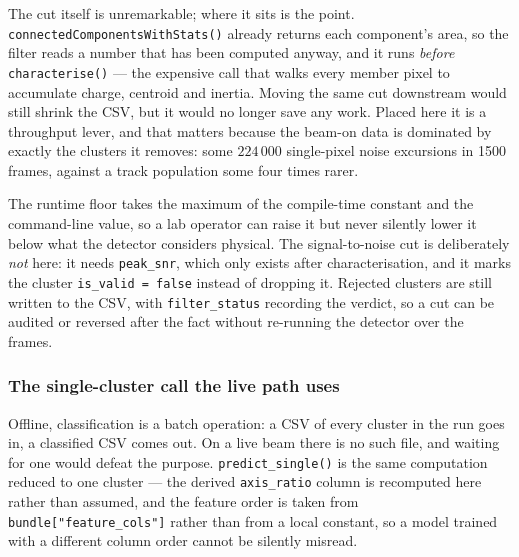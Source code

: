 \documentclass[a4paper,headsepline,oneside,11pt]{scrartcl}
\begin{document}
The cut itself is unremarkable; where it sits is the point.
\texttt{connectedComponentsWithStats()} already returns each component's area,
so the filter reads a number that has been computed anyway, and it runs
\emph{before} \texttt{characterise()} --- the expensive call that walks every
member pixel to accumulate charge, centroid and inertia. Moving the same cut
downstream would still shrink the CSV, but it would no longer save any work.
Placed here it is a throughput lever, and that matters because the beam-on data
is dominated by exactly the clusters it removes: some $224\,000$ single-pixel
noise excursions in 1500 frames, against a track population some four times
rarer.

The runtime floor takes the maximum of the compile-time constant and the
command-line value, so a lab operator can raise it but never silently lower it
below what the detector considers physical. The signal-to-noise cut is
deliberately \emph{not} here: it needs \texttt{peak\_snr}, which only exists
after characterisation, and it marks the cluster \texttt{is\_valid = false}
instead of dropping it. Rejected clusters are still written to the CSV, with
\texttt{filter\_status} recording the verdict, so a cut can be audited or
reversed after the fact without re-running the detector over the frames.

\subsubsection{The single-cluster call the live path uses}

\noindent\begin{minipage}[t]{\linewidth}

\end{minipage}

Offline, classification is a batch operation: a CSV of every cluster in the run
goes in, a classified CSV comes out. On a live beam there is no such file, and
waiting for one would defeat the purpose. \texttt{predict\_single()} is the same
computation reduced to one cluster --- the derived \texttt{axis\_ratio} column is
recomputed here rather than assumed, and the feature order is taken from
\lstinline|bundle["feature_cols"]| rather than from a local constant, so a model
trained with a different column order cannot be silently misread.
\end{document}
